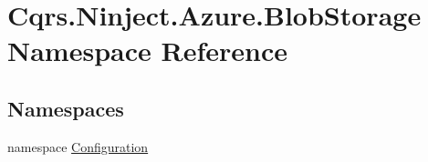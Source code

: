 \hypertarget{namespaceCqrs_1_1Ninject_1_1Azure_1_1BlobStorage}{}\section{Cqrs.\+Ninject.\+Azure.\+Blob\+Storage Namespace Reference}
\label{namespaceCqrs_1_1Ninject_1_1Azure_1_1BlobStorage}
\subsection*{Namespaces}
\begin{DoxyCompactItemize}
\item 
namespace \hyperlink{namespaceCqrs_1_1Ninject_1_1Azure_1_1BlobStorage_1_1Configuration}{Configuration}
\end{DoxyCompactItemize}
